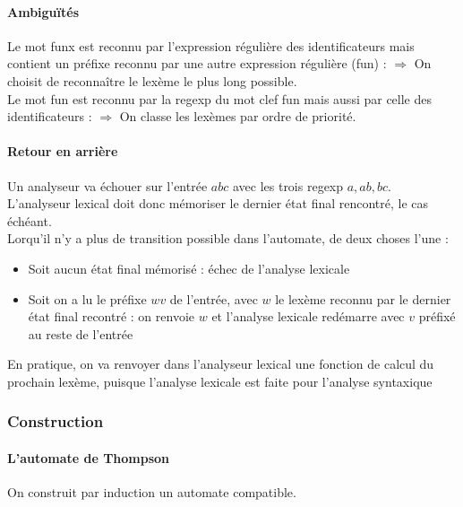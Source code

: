 \documentclass{cours}
\begin{document}
\paragraph*{Ambiguïtés}
Le mot \textmd{funx} est reconnu par l'expression régulière des identificateurs mais contient un préfixe reconnu par une autre expression régulière (\textmd{fun}) : $\Rightarrow$ On choisit de reconnaître le lexème le plus long possible.\\
Le mot \textmd{fun} est reconnu par la regexp du mot clef \textmd{fun} mais aussi par celle des identificateurs : $\Rightarrow$ On classe les lexèmes par ordre de priorité.

\paragraph*{Retour en arrière}
Un analyseur va échouer sur l'entrée $abc$ avec les trois regexp $a, ab, bc$.
L'analyseur lexical doit donc mémoriser le dernier état final rencontré, le cas échéant.\\

Lorqu'il n'y a plus de transition possible dans l'automate, de deux choses l'une :
\begin{itemize}
    \item Soit aucun état final mémorisé : échec de l'analyse lexicale
    \item Soit on a lu le préfixe $wv$ de l'entrée, avec $w$ le lexème reconnu par le dernier état final recontré : on renvoie $w$ et l'analyse lexicale redémarre avec $v$ préfixé au reste de l'entrée
\end{itemize}
En pratique, on va renvoyer dans l'analyseur lexical une fonction de calcul du prochain lexème, puisque l'analyse lexicale est faite pour l'analyse syntaxique 

\subsubsection{Construction}
\paragraph*{L'automate de Thompson}
On construit par induction un automate compatible. 
\end{document}
